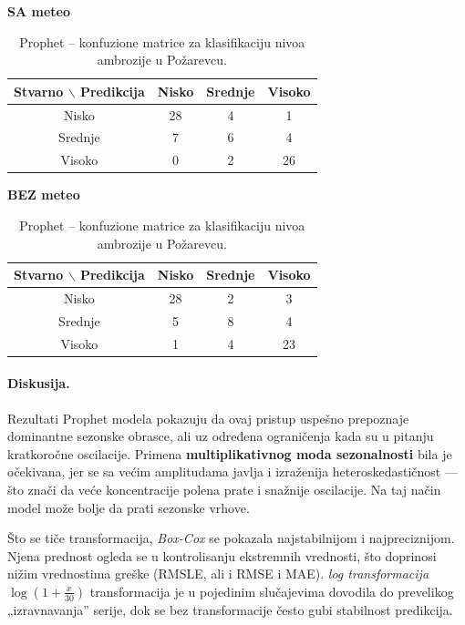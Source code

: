 \documentclass[12pt]{article}
\begin{document}
\begin{table}[H]
\centering
\caption{Prophet – konfuzione matrice za klasifikaciju nivoa ambrozije u Požarevcu.}
\label{tab:prophet_cm}
\renewcommand{\arraystretch}{1.3}
\begin{center}
\begin{minipage}{0.45\textwidth}
\centering
\textbf{SA meteo} \\[2mm]
\begin{tabular}{|c|c|c|c|}
\hline
\textbf{Stvarno $\backslash$ Predikcija} & \textbf{Nisko} & \textbf{Srednje} & \textbf{Visoko} \\ \hline
Nisko   & 28 & 4 & 1 \\ \hline
Srednje & 7 & 6 & 4 \\ \hline
Visoko  & 0 & 2 & 26 \\ \hline
\end{tabular}
\end{minipage}
\hfill
\begin{minipage}{0.45\textwidth}
\centering
\textbf{BEZ meteo} \\[2mm]
\begin{tabular}{|c|c|c|c|}
\hline
\textbf{Stvarno $\backslash$ Predikcija} & \textbf{Nisko} & \textbf{Srednje} & \textbf{Visoko} \\ \hline
Nisko   & 28 & 2 & 3 \\ \hline
Srednje & 5 & 8 & 4 \\ \hline
Visoko  & 1 & 4 & 23 \\ \hline
\end{tabular}
\end{minipage}
\end{center}
\end{table}

\paragraph{\textbf{Diskusija.}}  

Rezultati Prophet modela pokazuju da ovaj pristup uspešno prepoznaje dominantne sezonske obrasce, ali uz određena ograničenja kada su u pitanju kratkoročne oscilacije.  
Primena \textbf{multiplikativnog moda sezonalnosti} bila je očekivana, jer se sa većim amplitudama javlja i izraženija heteroskedastičnost — što znači da veće koncentracije polena prate i snažnije oscilacije. Na taj način model može bolje da prati sezonske vrhove.  

Što se tiče transformacija, \textit{Box-Cox} se pokazala najstabilnijom i najpreciznijom. Njena prednost ogleda se u kontrolisanju ekstremnih vrednosti, što doprinosi nižim vrednostima greške (RMSLE, ali i RMSE i MAE).  \textit{log transformacija $\log(1 + \tfrac{x}{30})$} transformacija je u pojedinim slučajevima dovodila do prevelikog „izravnavanja” serije, dok se bez transformacije često gubi stabilnost predikcija.  
\end{document}
